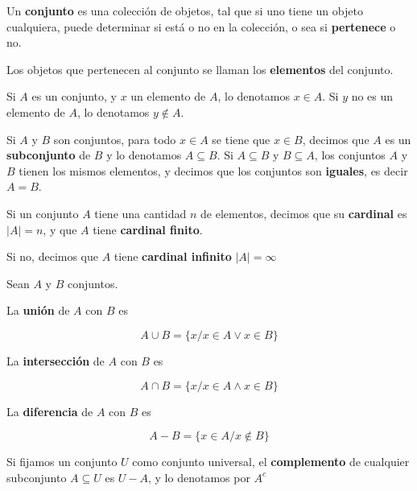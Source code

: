 \begin{definition}[Conjunto] 
Un \textbf{conjunto} es una colección de objetos, tal que si uno tiene un objeto cualquiera, puede determinar si está o no en la colección, o sea si \textbf{pertenece} o no.

Los objetos que pertenecen al conjunto se llaman los \textbf{elementos} del conjunto.

Si $A$ es un conjunto, y $x$ un elemento de $A$, lo denotamos $x \in A$.  Si $y$ no es un elemento de $A$, lo denotamos $y \not\in A$.

Si $A$ y $B$ son conjuntos, para todo $x \in A$ se tiene que $x \in B$, decimos que $A$ es un \textbf{subconjunto} de $B$  y lo denotamos $A \subseteq B$.  Si $A \subseteq B$ y $B \subseteq A$, los conjuntos $A$ y $B$ tienen los mismos elementos, y decimos que los conjuntos son \textbf{iguales}, es decir $A = B$.
\end{definition}

\begin{definition}[Cardinal] 
Si un conjunto $A$ tiene una cantidad $n$ de elementos, decimos que su \textbf{cardinal} es $|A| = n$, y que $A$ tiene \textbf{cardinal finito}.

Si no, decimos que $A$ tiene \textbf{cardinal infinito} $|A| = \infty$

\end{definition}


\begin{definition} 
Sean $A$ y $B$ conjuntos.  

La \textbf{unión}  de $A$ con $B$ es

$$A \cup B = \{ x / x \in A \vee x \in B \}$$

La \textbf{intersección}  de $A$ con $B$ es

$$A \cap B = \{ x / x \in A \wedge x \in B \}$$

La \textbf{diferencia}  de $A$ con $B$ es

$$A - B = \{ x \in A / x \not\in B\}$$

Si fijamos un conjunto $U$ como conjunto universal, el \textbf{complemento}  de cualquier subconjunto $A \subseteq U$ es $U-A$, y lo denotamos por $A^c$

\end{definition}

